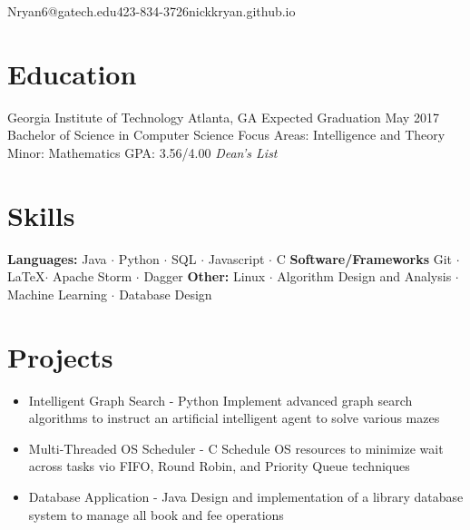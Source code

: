 \documentclass{resume_template}
\begin{document}
  
	
	\noindent{}
	{Nryan6@gatech.edu}{423-834-3726}{nickkryan.github.io}

	\section{Education}
 		\noindent\education
		{Georgia Institute of Technology}
		{Atlanta, GA}
		{Expected Graduation May 2017}
		{Bachelor of Science in Computer Science}
		{Focus Areas: Intelligence and Theory}
		{Minor: Mathematics}
		{GPA: 3.56/4.00 \textit{Dean's List}}
	\section{Skills}
	\noindent\textbf{Languages:} Java $\cdot$ Python $\cdot$ SQL $\cdot$ Javascript $\cdot$ C\newline
	\textbf{Software/Frameworks} Git $\cdot$ \LaTeX $\cdot$ Apache Storm $\cdot$ Dagger\newline
	\textbf{Other:} Linux $\cdot$ Algorithm Design and Analysis $\cdot$ Machine Learning $\cdot$ Database Design
	\section{Projects}
	\noindent\begin{itemize}[leftmargin=0.4cm]
	\item Intelligent Graph Search - Python\newline
		\tab Implement advanced graph search algorithms to instruct an artificial intelligent agent to solve various mazes
	\item Multi-Threaded OS Scheduler - C\newline
		\tab Schedule OS resources to minimize wait across tasks vio FIFO, Round Robin, and Priority Queue techniques
	\item Database Application - Java\newline
		\tab Design and implementation of a library database system to manage all book and fee operations
	\end{itemize}
\end{document}
